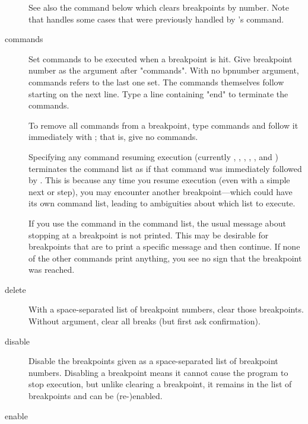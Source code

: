 \begin{description}
See also the  command below which clears breakpoints by
number. Note that  handles some cases that were
previously handled by 's  command.

\item[commands \optional{\optional{\var{bpnumber}}}]

Set commands to be executed when a breakpoint is hit.
Give breakpoint number as the argument after "commands".
With no bpnumber argument, commands refers to the last one set.
The commands themselves follow starting on the next line.
Type a line containing "end" to terminate the commands.

To remove all commands from a breakpoint, type commands and
follow it immediately with ; that is, give no commands.

Specifying any command resuming execution (currently ,
, , , , and )
terminates the command list as if that command was immediately
followed by .  This is because any time you resume execution
(even with a simple next or step), you may encounter another
breakpoint---which could have its own command list, leading to
ambiguities about which list to execute.

If you use the  command in the command list, the
usual message about stopping at a breakpoint is not printed.
This may be desirable for breakpoints that are to print a
specific message and then continue.  If none of the other
commands print anything, you see no sign that the breakpoint
was reached.

\item[delete \optional{\var{bpnumber} \optional{\var{bpnumber \ldots}}}]

With a space-separated list of breakpoint numbers, clear those
breakpoints.  Without argument, clear all breaks (but first
ask confirmation).

\item[disable \optional{\var{bpnumber} \optional{\var{bpnumber \ldots}}}]

Disable the breakpoints given as a space-separated list of
breakpoint numbers.  Disabling a breakpoint means it cannot cause
the program to stop execution, but unlike clearing a breakpoint, it
remains in the list of breakpoints and can be (re-)enabled.

\item[enable \optional{\var{bpnumber} \optional{\var{bpnumber \ldots}}}]


\end{description}
